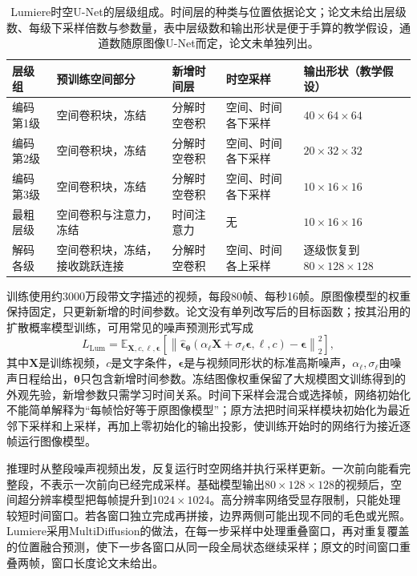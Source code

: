 \begin{table}[tbp]
 \centering
 \small
 \begin{tabularx}{\linewidth}{@{}p{24mm}p{30mm}p{34mm}p{26mm}X@{}}
  \toprule
  层级组 & 预训练空间部分 & 新增时间层 & 时空采样 & 输出形状（教学假设） \\
  \midrule
  编码第1级 & 空间卷积块，冻结 & 分解时空卷积 & 空间、时间各下采样 & $40\times64\times64$ \\
  编码第2级 & 空间卷积块，冻结 & 分解时空卷积 & 空间、时间各下采样 & $20\times32\times32$ \\
  编码第3级 & 空间卷积块，冻结 & 分解时空卷积 & 空间、时间各下采样 & $10\times16\times16$ \\
  最粗层级 & 空间卷积与注意力，冻结 & 时间注意力 & 无 & $10\times16\times16$ \\
  解码各级 & 空间卷积块，冻结，接收跳跃连接 & 分解时空卷积 & 空间、时间各上采样 & 逐级恢复到$80\times128\times128$ \\
  \bottomrule
 \end{tabularx}
 \caption{Lumiere时空U-Net的层级组成。时间层的种类与位置依据论文；论文未给出层级数、每级下采样倍数与参数量，表中层级数和输出形状是便于手算的教学假设，通道数随原图像U-Net而定，论文未单独列出。}
 \label{tab:vision-multigen-lumiere-stunet}
\end{table}
\FloatBarrier

训练使用约3000万段带文字描述的视频，每段80帧、每秒16帧。原图像模型的权重保持固定，只更新新增的时间参数。论文没有单列改写后的目标函数；按其沿用的扩散概率模型训练，可用常见的噪声预测形式写成
\begin{equation}
  L_{\mathrm{Lum}}
  =\mathbb E_{\bm X,c,\ell,\bm\epsilon}
   \left[
    \left\lVert
     \widehat{\bm\epsilon}_{\bm\theta}(\alpha_\ell\bm X+\sigma_\ell\bm\epsilon,\ell,c)-\bm\epsilon
    \right\rVert_2^2
   \right],
  \label{eq:vision-lumiere-objective}
\end{equation}
其中$\bm X$是训练视频，$c$是文字条件，$\bm\epsilon$是与视频同形状的标准高斯噪声，$\alpha_\ell,\sigma_\ell$由噪声日程给出，$\bm\theta$只包含新增时间参数。冻结图像权重保留了大规模图文训练得到的外观先验，新增参数只需学习时间关系。时间下采样会混合或选择帧，网络初始化不能简单解释为“每帧恰好等于原图像模型”；原方法把时间采样模块初始化为最近邻下采样和上采样，再加上零初始化的输出投影，使训练开始时的网络行为接近逐帧运行图像模型。

推理时从整段噪声视频出发，反复运行时空网络并执行采样更新。一次前向能看完整段，不表示一次前向已经完成采样。基础模型输出$80\times128\times128$的视频后，空间超分辨率模型把每帧提升到$1024\times1024$。高分辨率网络受显存限制，只能处理较短时间窗口。若各窗口独立完成再拼接，边界两侧可能出现不同的毛色或光照。Lumiere采用MultiDiffusion的做法，在每一步采样中处理重叠窗口，再对重复覆盖的位置融合预测，使下一步各窗口从同一段全局状态继续采样；原文的时间窗口重叠两帧，窗口长度论文未给出。

